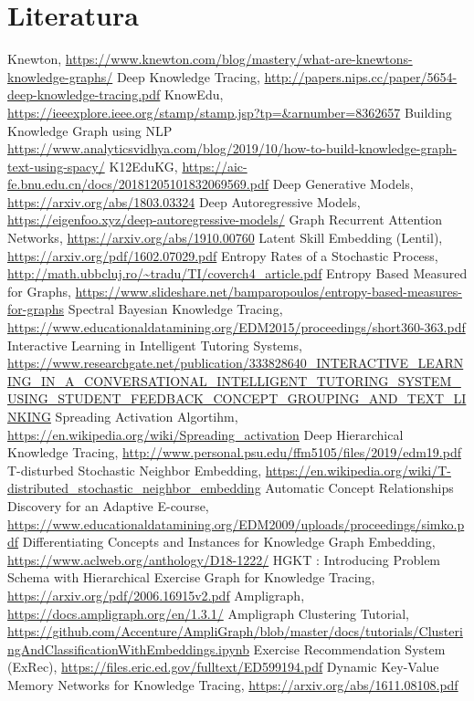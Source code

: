 \chapter{Literatura}
\renewcommand{\bibsection}{}
\begin{thebibliography}{9}
	
	 Knewton, \url{https://www.knewton.com/blog/mastery/what-are-knewtons-knowledge-graphs/}
	 Deep Knowledge Tracing, \url{ http://papers.nips.cc/paper/5654-deep-knowledge-tracing.pdf}
	 KnowEdu, \url{ https://ieeexplore.ieee.org/stamp/stamp.jsp?tp=&arnumber=8362657}
	 Building Knowledge Graph using NLP \url{https://www.analyticsvidhya.com/blog/2019/10/how-to-build-knowledge-graph-text-using-spacy/}
	 K12EduKG, \url{https://aic-fe.bnu.edu.cn/docs/20181205101832069569.pdf}
	 Deep Generative Models, \url{https://arxiv.org/abs/1803.03324}
	 Deep Autoregressive Models, \url{https://eigenfoo.xyz/deep-autoregressive-models/}
	 Graph Recurrent Attention Networks, \url{https://arxiv.org/abs/1910.00760}
	 Latent Skill Embedding (Lentil), \url{https://arxiv.org/pdf/1602.07029.pdf}
	 Entropy Rates of a Stochastic Process, \url{http://math.ubbcluj.ro/~tradu/TI/coverch4_article.pdf}
	 Entropy Based Measured for Graphs, \url{https://www.slideshare.net/bamparopoulos/entropy-based-measures-for-graphs}
	 Spectral Bayesian Knowledge Tracing, \url{https://www.educationaldatamining.org/EDM2015/proceedings/short360-363.pdf}
	 Interactive Learning in Intelligent Tutoring Systems, \url{https://www.researchgate.net/publication/333828640_INTERACTIVE_LEARNING_IN_A_CONVERSATIONAL_INTELLIGENT_TUTORING_SYSTEM_USING_STUDENT_FEEDBACK_CONCEPT_GROUPING_AND_TEXT_LINKING}
	 Spreading Activation Algortihm, \url{https://en.wikipedia.org/wiki/Spreading_activation}
	 Deep Hierarchical Knowledge Tracing, \url{http://www.personal.psu.edu/ffm5105/files/2019/edm19.pdf}
	 T-disturbed Stochastic Neighbor Embedding, \url{https://en.wikipedia.org/wiki/T-distributed_stochastic_neighbor_embedding}
	 Automatic Concept Relationships Discovery for an Adaptive E-course, \url{https://www.educationaldatamining.org/EDM2009/uploads/proceedings/simko.pdf}
	 Differentiating Concepts and Instances for Knowledge Graph Embedding, \url{https://www.aclweb.org/anthology/D18-1222/}
	 HGKT : Introducing Problem Schema with Hierarchical Exercise Graph for Knowledge Tracing, \url{https://arxiv.org/pdf/2006.16915v2.pdf}
	 Ampligraph, \url{https://docs.ampligraph.org/en/1.3.1/}
	 Ampligraph Clustering Tutorial, \url{https://github.com/Accenture/AmpliGraph/blob/master/docs/tutorials/ClusteringAndClassificationWithEmbeddings.ipynb}
	 Exercise Recommendation System (ExRec), \url{https://files.eric.ed.gov/fulltext/ED599194.pdf}
	 Dynamic Key-Value Memory Networks for Knowledge Tracing, \url{https://arxiv.org/abs/1611.08108.pdf}
	
\end{thebibliography}